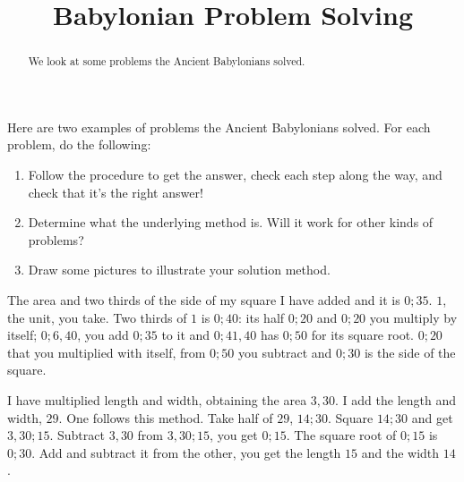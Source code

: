 \documentclass[nooutcomes]{ximera}
\title{Babylonian Problem Solving}
\begin{document}
\begin{abstract}
    We look at some problems the Ancient Babylonians solved.
\end{abstract}
\maketitle

Here are two examples of problems the Ancient Babylonians solved. For each problem, do the following:
\begin{enumerate}
	\item Follow the procedure to get the answer, check each step along the way, and check that it's the right answer!
	\item Determine what the underlying method is. Will it work for other kinds of problems?
	\item Draw some pictures to illustrate your solution method.
\end{enumerate}

\begin{problem}
The area and two thirds of the side of my square I have added and it is $0;35$. $1$, the unit, you take. Two thirds of $1$ is $0;40$: its half $0;20$ and $0;20$ you multiply by itself; $0;6,40$, you add $0;35$ to it and $0;41,40$ has $0;50$ for its square root. $0;20$ that you multiplied with itself, from $0;50$ you subtract and $0;30$ is the side of the square.
\end{problem}

\begin{problem}
I have multiplied length and width, obtaining the area $3,30$. I add the length and width, $29$. One follows this method. Take half of $29$, $14;30$. Square $14;30$ and get $3,30;15$. Subtract $3,30$ from $3,30;15$, you get $0;15$. The square root of $0;15$ is $0;30$. Add and subtract it from the other, you get the length $15$ and the width $14$.
\end{problem}
\end{document}
